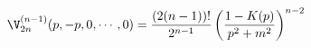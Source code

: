 \begin{equation}
\V_{2n}^{(n-1)} (p,-p,0,\cdots,0) = \frac{(2(n-1))!}{2^{n-1}} \left(
\frac{1 - K(p)}{p^2+m^2} \right)^{n-2}
\end{equation}

